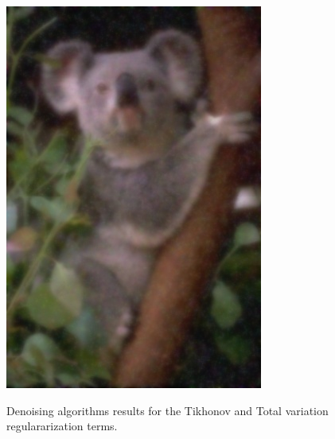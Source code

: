 \begin{figure}
{\includegraphics[scale=0.38]{figures/chapter2/denoising/coala-tikhonov.png}
}%
%
\caption{Denoising algorithms results for the Tikhonov and Total variation regulararization terms.}
\label{ch1:fig:denoising-results}
\end{figure}



